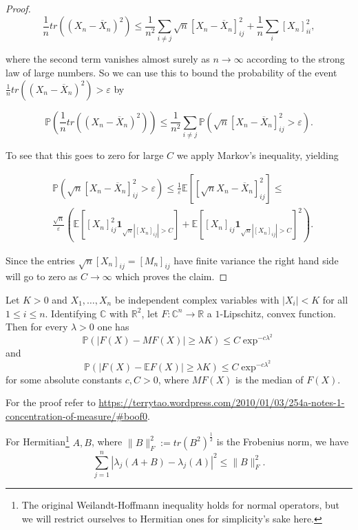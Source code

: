\begin{proof}
	$$\frac{1}{n}tr\left((X_n-\overline X_n)^2\right) \leq
	\frac{1}{n^2}\sum_{i\neq j}\sqrt n\left[X_n-\overline X_n\right]_{ij}^2+\frac{1}{n}\sum_i [X_n]_{ii}^2,$$
	
	where the second term vanishes almost surely as $n\rightarrow\infty$ according to the strong law of large numbers. So we can use this to bound the probability of the event $\frac{1}{n}tr\left((X_n-\overline X_n)^2\right)>\varepsilon$ by
	
	$$
	\mathbb P\left(\frac{1}{n}tr\left((X_n-\overline X_n)^2\right)\right)\leq
	\frac{1}{n^2}\sum_{i\neq j}\mathbb P\left(\sqrt n[X_n-\overline X_n]_{ij}^2>\varepsilon\right).
	$$
	
	To see that this goes to zero for large $C$ we apply Markov's inequality, yielding 
	
	\begin{align*}
		&\mathbb P(\sqrt n[X_n-\overline X_n]_{ij}^2>\varepsilon)\leq
	\frac{1}{\varepsilon}\mathbb E\left[[\sqrt n X_n-\overline X_n]_{ij}^2\right]\leq\\
	&\frac{\sqrt n}{\varepsilon}\left(\mathbb E[[X_n]_{ij}^2\mathbf 1_{\sqrt n |[X_n]_{ij}|>C}]+\mathbb E[[X_n]_{ij}\mathbf 1_{\sqrt n |[X_n]_{ij}|>C}]^2\right).
	\end{align*}
	
	Since the entries $\sqrt n [X_n]_{ij}=[M_n]_{ij}$ have finite variance the right hand side will go to zero as $C\rightarrow\infty$ which proves the claim.
\end{proof}

\begin{theorem}
	Let $K>0$ and $X_1,\dots,X_n$ be independent complex variables with $|X_i|<K$ for all $1\leq i\leq n$. Identifying $\mathbb C$ with $\mathbb R^2$, let $F:\mathbb C^n\rightarrow\mathbb R$ a $1$-Lipschitz, convex function. Then for every $\lambda>0$ one has
	$$\mathbb P(|F(X)-MF(X)|\geq \lambda K)\leq C\exp^{-c\lambda^2}$$ and $$\mathbb P(|F(X)-\mathbb EF(X)|\geq \lambda K)\leq C\exp^{-c\lambda^2}$$
	for some absolute constants $c,C>0$, where $MF(X)$ is the median of $F(X)$.
\end{theorem}
For the proof refer to \url{https://terrytao.wordpress.com/2010/01/03/254a-notes-1-concentration-of-measure/#boof0}.

\begin{theorem}
	For Hermitian\footnote{The original Weilandt-Hoffmann inequality holds for normal operators, but we will restrict ourselves to Hermitian ones for simplicity's sake here.} $A,B$, where $\|B\|_F^2:=tr(B^2)^{\frac{1}{2}}$ is the Frobenius norm, we have
	$$\sum_{j=1}^n|\lambda_j(A+B)-\lambda_j(A)|^2\leq\|B\|_F^2.$$
\end{theorem}

